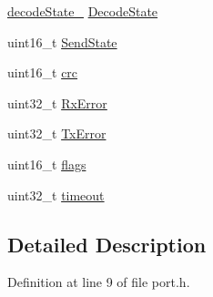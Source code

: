 \begin{DoxyCompactItemize}
\hyperlink{experimental_2_u_s_b___u_p_l_o_a_d___t_o_o_l_2_s_s_p_2common_8h_aca51c380bc924bd9e5d794ce37ec7194}{decode\-State\-\_\-} \hyperlink{group___uploader_gac689b116d4d7c80713d964bd631e9511}{Decode\-State}
\item 
uint16\-\_\-t \hyperlink{group___uploader_ga9eaf6bf50865d1b4f8470110523b9f6b}{Send\-State}
\item 
uint16\-\_\-t \hyperlink{group___uploader_ga6ad77d0d0cc02d7ce86e13041ef33c5e}{crc}
\item 
uint32\-\_\-t \hyperlink{group___uploader_ga6d92cd4c24b14264e16528a599123db4}{Rx\-Error}
\item 
uint32\-\_\-t \hyperlink{group___uploader_ga9b23351e935a17b3a216b903dabac29c}{Tx\-Error}
\item 
uint16\-\_\-t \hyperlink{group___uploader_gae9ceccbaac142c00a4699e9020d27f4b}{flags}
\item 
uint32\-\_\-t \hyperlink{group___uploader_gac5f404a47ec2583f83bd610d5f184308}{timeout}
\end{DoxyCompactItemize}


\subsection{Detailed Description}


Definition at line 9 of file port.\-h.



